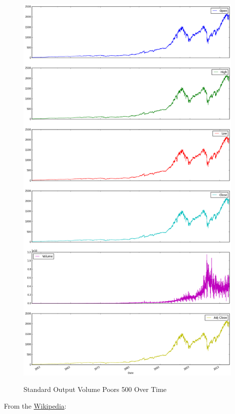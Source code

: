 \begin{figure}[bth]
  \myfloatalign
  {\includegraphics[width=1\linewidth]
    {gfx/standard-and-poors-500-over-time}}
  \caption{Standard Output Volume Poors 500
    Over Time}
  \label{fig:standard-and-poors-500-over-time}
\end{figure}

From the
\href{https://en.wikipedia.org/wiki/S\%26P_500_Index}{Wikipedia}:

